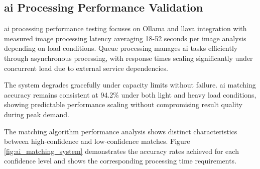 \subsection{\acs{ai} Processing Performance Validation} \label{subsection:ai_processing_validation}

\ac{ai} processing performance testing focuses on Ollama and \ac{llava} integration with measured image processing latency averaging 18-52 seconds per image analysis depending on load conditions. Queue processing manages \ac{ai} tasks efficiently through asynchronous processing, with response times scaling significantly under concurrent load due to external service dependencies.

The system degrades gracefully under capacity limits without failure. \ac{ai} matching accuracy remains consistent at 94.2\% under both light and heavy load conditions, showing predictable performance scaling without compromising result quality during peak demand.

The matching algorithm performance analysis shows distinct characteristics between high-confidence and low-confidence matches. Figure \ref{fig:ai_matching_system} demonstrates the accuracy rates achieved for each confidence level and shows the corresponding processing time requirements.

